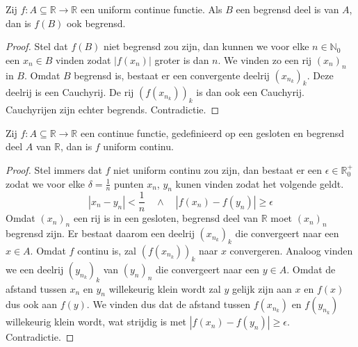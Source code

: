 \documentclass[main.tex]{subfiles}
\begin{document}
\begin{bpr}
  Zij $f: A \subseteq \mathbb{R} \rightarrow \mathbb{R}$ een uniform continue functie.
  Als $B$ een begrensd deel is van $A$, dan is $f(B)$ ook begrensd.

  \begin{proof}
    Stel dat $f(B)$ niet begrensd zou zijn, dan kunnen we voor elke $n\in \mathbb{N}_{0}$ een $x_{n}\in B$ vinden zodat $|f(x_{n})|$ groter is dan $n$.
    We vinden zo een rij $(x_{n})_{n}$ in $B$.
    Omdat $B$ begrensd is, bestaat er een convergente deelrij $(x_{n_{k}})_{k}$.
    Deze deelrij is een Cauchyrij.
    De rij $(f(x_{n_{k}}))_{k}$ is dan ook een Cauchyrij.
    Cauchyrijen zijn echter begrends. Contradictie.
  \end{proof}
\end{bpr}

\begin{bst}
  \label{st:gesloten-en-begrensd-interval-continu-dan-uniform-continu}
  Zij $f: A \subseteq \mathbb{R} \rightarrow \mathbb{R}$ een continue functie, gedefinieerd op een gesloten en begrensd deel $A$ van $\mathbb{R}$, dan is $f$ uniform continu.

  \begin{proof}
    Stel immers dat $f$ niet uniform continu zou zijn, dan bestaat er een $\epsilon \in \mathbb{R}_{0}^{+}$ zodat we voor elke $\delta = \frac{1}{n}$ punten $x_{n}$, $y_{n}$ kunen vinden zodat het volgende geldt.
    \[ |x_{n}-y_{n}| < \frac{1}{n} \quad\wedge\quad |f(x_{n})-f(y_{n})| \ge \epsilon \]
    Omdat $(x_{n})_{n}$ een rij is in een gesloten, begrensd deel van $\mathbb{R}$ moet $(x_{n})_{n}$ begrensd zijn.
    Er bestaat daarom een deelrij $(x_{n_{k}})_{k}$ die convergeert naar een $x\in A$.
    Omdat $f$ continu is, zal $(f(x_{n_{k}}))_{k}$ naar $x$ convergeren.
    Analoog vinden we een deelrij $(y_{n_{k}})_{k}$ van $(y_{n})_{n}$ die convergeert naar een $y\in A$.
    Omdat de afstand tussen $x_{n}$ en $y_{n}$ willekeurig klein wordt zal $y$ gelijk zijn aan $x$ en $f(x)$ dus ook aan $f(y)$.
    We vinden dus dat de afstand tussen $f(x_{n_{k}})$ en $f(y_{n_{k}})$ willekeurig klein wordt, wat strijdig is met $|f(x_{n})-f(y_{n})| \ge \epsilon$.
    Contradictie.
  \end{proof}
\end{bst}
\end{document}
